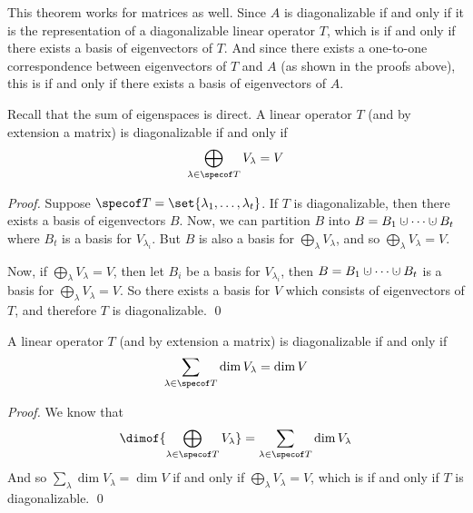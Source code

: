 This theorem works for matrices as well.
Since $A$ is diagonalizable if and only if it is the representation of a diagonalizable linear operator $T$, which is if and only if there exists a basis of eigenvectors of $T$.
And since there exists a one-to-one correspondence between eigenvectors of $T$ and $A$ (as shown in the proofs above), this is if and only if there exists a basis of eigenvectors of $A$.

\begin{prop*}

    Recall that the sum of eigenspaces is direct.
    A linear operator $T$ (and by extension a matrix) is diagonalizable if and only if
    \[ \bigoplus_{\lambda\in\specof T}V_\lambda = V \]

\end{prop*}

\begin{proof}

    Suppose $\specof T=\set{\lambda_1,\dots,\lambda_t}$.
    If $T$ is diagonalizable, then there exists a basis of eigenvectors $B$.
    Now, we can partition $B$ into $B=B_1\dcup\cdots\dcup B_t$ where $B_t$ is a basis for $V_{\lambda_i}$.
    But $B$ is also a basis for $\bigoplus_\lambda V_\lambda$, and so $\bigoplus_\lambda V_\lambda=V$.

    Now, if $\bigoplus_\lambda V_\lambda=V$, then let $B_i$ be a basis for $V_{\lambda_i}$, then $B=B_1\dcup\cdots\dcup B_t$ is a basis for $\bigoplus_\lambda V_\lambda=V$.
    So there exists a basis for $V$ which consists of eigenvectors of $T$, and therefore $T$ is diagonalizable.
    \qed

\end{proof}

\begin{prop*}

    A linear operator $T$ (and by extension a matrix) is diagonalizable if and only if
    \[ \sum_{\lambda\in\specof T}\dim V_\lambda = \dim V \]

\end{prop*}

\begin{proof}

    We know that
    \[ \dimof{\bigoplus_{\lambda\in\specof T}V_\lambda} = \sum_{\lambda\in\specof T}\dim V_\lambda \]
    And so $\sum_\lambda\dim V_\lambda=\dim V$ if and only if $\bigoplus_\lambda V_\lambda=V$, which is if and only if $T$ is diagonalizable.
    \qed

\end{proof}


